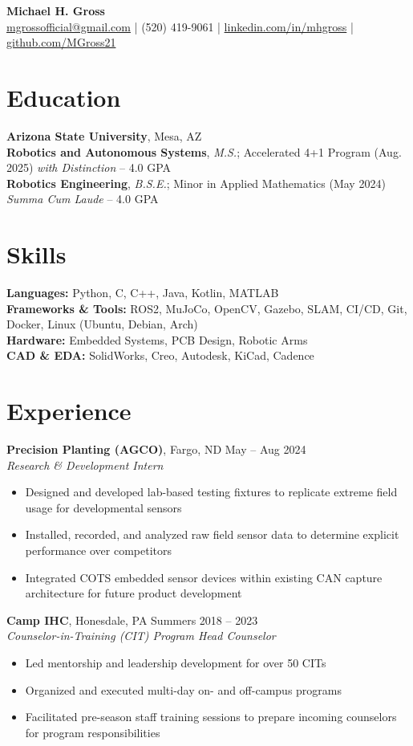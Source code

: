 \documentclass[10pt]{article}
\begin{document}
\begin{center}
    {\LARGE \textbf{Michael H. Gross}} \\
    \href{mailto:mgrossofficial@gmail.com}{mgrossofficial@gmail.com} | (520) 419-9061 | 
    \href{https://www.linkedin.com/in/mhgross}{linkedin.com/in/mhgross} | \href{https://github.com/MGross21}{github.com/MGross21}
\end{center}

\section*{Education}
\textbf{Arizona State University}, Mesa, AZ \\
\textbf{Robotics and Autonomous Systems}, \textit{M.S.}; Accelerated 4+1 Program (Aug. 2025) \hfill \textit{with Distinction} -- 4.0 GPA \\
\textbf{Robotics Engineering}, \textit{B.S.E.}; Minor in Applied Mathematics (May 2024) \hfill \textit{Summa Cum Laude} -- 4.0 GPA

\section*{Skills}
\textbf{Languages:} Python, C, C++, Java, Kotlin, MATLAB \\
\textbf{Frameworks \& Tools:} ROS2, MuJoCo, OpenCV, Gazebo, SLAM, CI/CD, Git, Docker, Linux (Ubuntu, Debian, Arch) \\
\textbf{Hardware:} Embedded Systems, PCB Design, Robotic Arms \\
\textbf{CAD \& EDA:} SolidWorks, Creo, Autodesk, KiCad, Cadence

\section*{Experience}
\textbf{Precision Planting (AGCO)}, Fargo, ND \hfill May -- Aug 2024 \\
\textit{Research \& Development Intern}
\begin{itemize}
  \item Designed and developed lab-based testing fixtures to replicate extreme field usage for developmental sensors
  \item Installed, recorded, and analyzed raw field sensor data to determine explicit performance over competitors
  \item Integrated COTS embedded sensor devices within existing CAN capture architecture for future product development
\end{itemize}
\vspace{0.5em}
\textbf{Camp IHC}, Honesdale, PA \hfill Summers 2018 -- 2023 \\
\textit{Counselor-in-Training (CIT) Program Head Counselor}
\begin{itemize}
  \item Led mentorship and leadership development for over 50 CITs
  \item Organized and executed multi-day on- and off-campus programs
  \item Facilitated pre-season staff training sessions to prepare incoming counselors for program responsibilities
\end{itemize}
\end{document}

